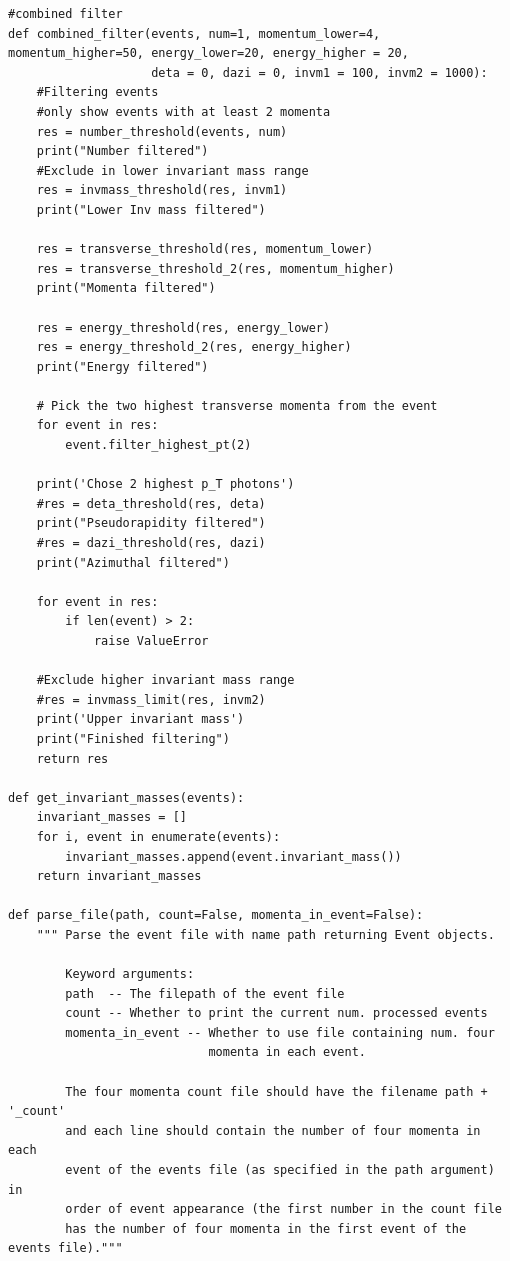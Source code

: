 \documentclass{article}
\begin{document}
\begin{lstlisting}
#combined filter
def combined_filter(events, num=1, momentum_lower=4, momentum_higher=50, energy_lower=20, energy_higher = 20,
                    deta = 0, dazi = 0, invm1 = 100, invm2 = 1000):
    #Filtering events
    #only show events with at least 2 momenta
    res = number_threshold(events, num)
    print("Number filtered")
    #Exclude in lower invariant mass range
    res = invmass_threshold(res, invm1)
    print("Lower Inv mass filtered")

    res = transverse_threshold(res, momentum_lower)
    res = transverse_threshold_2(res, momentum_higher)
    print("Momenta filtered")

    res = energy_threshold(res, energy_lower)
    res = energy_threshold_2(res, energy_higher)
    print("Energy filtered")

    # Pick the two highest transverse momenta from the event
    for event in res:
        event.filter_highest_pt(2)

    print('Chose 2 highest p_T photons')
    #res = deta_threshold(res, deta)
    print("Pseudorapidity filtered")
    #res = dazi_threshold(res, dazi)
    print("Azimuthal filtered")

    for event in res:
        if len(event) > 2:
            raise ValueError

    #Exclude higher invariant mass range
    #res = invmass_limit(res, invm2)
    print('Upper invariant mass')
    print("Finished filtering")
    return res

def get_invariant_masses(events):
    invariant_masses = []
    for i, event in enumerate(events):
        invariant_masses.append(event.invariant_mass())
    return invariant_masses

def parse_file(path, count=False, momenta_in_event=False):
    """ Parse the event file with name path returning Event objects.

        Keyword arguments:
        path  -- The filepath of the event file
        count -- Whether to print the current num. processed events
        momenta_in_event -- Whether to use file containing num. four
                            momenta in each event.

        The four momenta count file should have the filename path + '_count'
        and each line should contain the number of four momenta in each
        event of the events file (as specified in the path argument) in
        order of event appearance (the first number in the count file
        has the number of four momenta in the first event of the events file)."""


\end{lstlisting}
\end{document}
